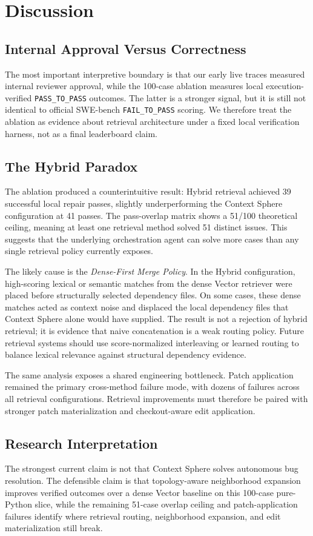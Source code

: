 \section{Discussion}
\label{sec:discussion}

\subsection{Internal Approval Versus Correctness}

The most important interpretive boundary is that our early live traces measured internal reviewer approval, while the 100-case ablation measures local execution-verified \texttt{PASS\_TO\_PASS} outcomes. The latter is a stronger signal, but it is still not identical to official SWE-bench \texttt{FAIL\_TO\_PASS} scoring. We therefore treat the ablation as evidence about retrieval architecture under a fixed local verification harness, not as a final leaderboard claim.

\subsection{The Hybrid Paradox}

The ablation produced a counterintuitive result: Hybrid retrieval achieved 39 successful local repair passes, slightly underperforming the Context Sphere configuration at 41 passes. The pass-overlap matrix shows a 51/100 theoretical ceiling, meaning at least one retrieval method solved 51 distinct issues. This suggests that the underlying orchestration agent can solve more cases than any single retrieval policy currently exposes.

The likely cause is the \textit{Dense-First Merge Policy}. In the Hybrid configuration, high-scoring lexical or semantic matches from the dense Vector retriever were placed before structurally selected dependency files. On some cases, these dense matches acted as context noise and displaced the local dependency files that Context Sphere alone would have supplied. The result is not a rejection of hybrid retrieval; it is evidence that naive concatenation is a weak routing policy. Future retrieval systems should use score-normalized interleaving or learned routing to balance lexical relevance against structural dependency evidence.

The same analysis exposes a shared engineering bottleneck. Patch application remained the primary cross-method failure mode, with dozens of failures across all retrieval configurations. Retrieval improvements must therefore be paired with stronger patch materialization and checkout-aware edit application.

\subsection{Research Interpretation}

The strongest current claim is not that Context Sphere solves autonomous bug resolution. The defensible claim is that topology-aware neighborhood expansion improves verified outcomes over a dense Vector baseline on this 100-case pure-Python slice, while the remaining 51-case overlap ceiling and patch-application failures identify where retrieval routing, neighborhood expansion, and edit materialization still break.
